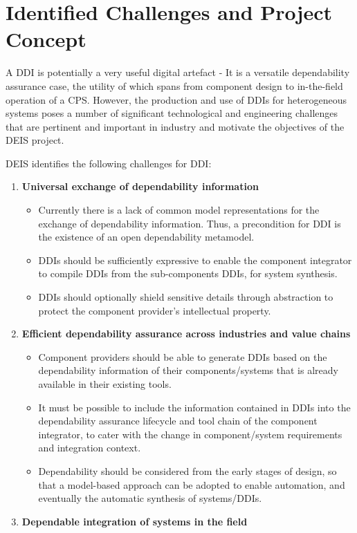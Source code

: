 \section{Identified Challenges and Project Concept}
A DDI is potentially a very useful digital artefact - It is a versatile dependability assurance case, the utility of which spans from component design to in-the-field operation of a CPS. However, the production and use of DDIs for heterogeneous systems poses a number of significant technological and engineering challenges that are pertinent and important in industry and motivate the objectives of the DEIS project. 

DEIS identifies the following challenges for DDI:
\clearpage
\begin{enumerate}
	\item \textbf{Universal exchange of dependability information}
		\begin{itemize}
			\item Currently there is a lack of common model representations for the exchange of dependability information. Thus, a precondition for DDI is the existence of an open dependability metamodel. 
			\item DDIs should be sufficiently expressive to enable the component integrator to compile DDIs from the sub-components DDIs, for system synthesis.
			\item DDIs should optionally shield sensitive details through abstraction to protect the component provider's intellectual property. 
		\end{itemize}
	\item \textbf{Efficient dependability assurance across industries and value chains}
		\begin{itemize}
			\item Component providers should be able to generate DDIs based on the dependability information of their components/systems that is already available in their existing tools.
			\item It must be possible to include the information contained in DDIs into the dependability assurance lifecycle and tool chain of the component integrator, to cater with the change in component/system requirements and integration context.
			\item Dependability should be considered from the early stages of design, so that a model-based approach can be adopted to enable automation, and eventually the automatic synthesis of systems/DDIs.
		\end{itemize}
	\item \textbf{Dependable integration of systems in the field}

\end{enumerate}
